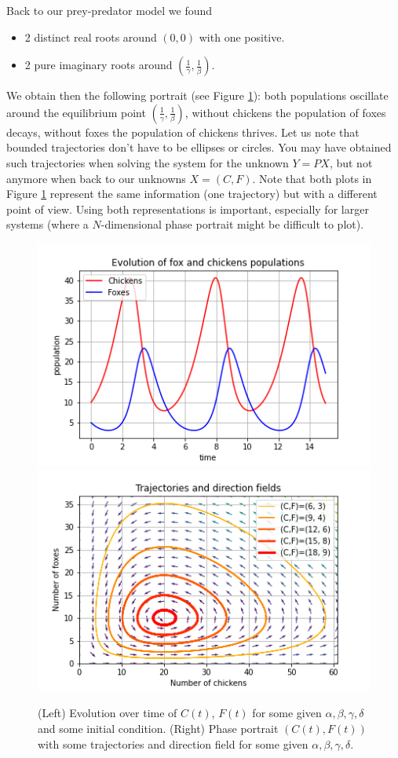 Back to our prey-predator model we found
\begin{itemize}
\item 2 distinct real roots around $(0,0)$ with one positive.
\item 2 pure imaginary roots around $(\frac{1}{\gamma},\frac{1}{\beta})$.
\end{itemize}
We obtain then the following portrait (see Figure \ref{fig:phase}): both populations oscillate around the equilibrium point $(\frac{1}{\gamma},\frac{1}{\beta})$, without chickens the population of foxes decays, without foxes the population of chickens thrives. Let us note that bounded trajectories don't have to be ellipses or circles. You may have obtained such trajectories when solving the system for the unknown $Y = PX$, but not anymore when back to our unknowns $X = (C,F)$. Note that both plots in Figure \ref{fig:phase} represent the same information (one trajectory) but with a different point of view. Using both representations is important, especially for larger systems (where a $N$-dimensional phase portrait might be difficult to plot).
 \begin{figure}[h!]
  \centering
  \includegraphics[width=0.49\linewidth]{img/chickens_and_foxes_1.png}
    \includegraphics[width=0.49\linewidth]{img/chickens_and_foxes_2.png}
  \caption{(Left) Evolution over time of $C(t)$, $F(t)$ for some given $\alpha, \beta, \gamma, \delta$ and some initial condition. (Right) Phase portrait $(C(t), F(t))$ with some trajectories and direction field for some given $\alpha, \beta, \gamma, \delta$.}
  \label{fig:phase}
 \end{figure}
 
